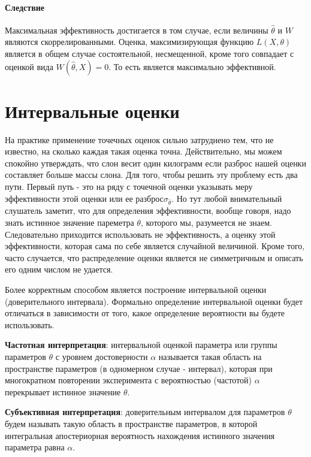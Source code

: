 \paragraph{Следствие}

Максимальная эффективность достигается в том случае, если величины
$\hat\theta$ и $W$ являются скоррелированными. Оценка,
максимизирующая функцию $L(X,\theta)$ является в общем случае
состоятельной, несмещенной, кроме того совпадает с оценкой вида
$W(\hat\theta, X) = 0$. То есть является максимально эффективной.


\section{Интервальные оценки}

    На практике применение точечных оценок сильно затруднено тем, что не
известно, на сколько каждая такая оценка точна. Действительно, мы можем
спокойно утверждать, что слон весит один килограмм если разброс нашей
оценки составляет больше массы слона. Для того, чтобы решить эту
проблему есть два пути. Первый путь - это на ряду с точечной оценки
указывать меру эффективности этой оценки или ее
разброс$\sigma_{\hat\theta}$. Но тут любой внимательный слушатель
заметит, что для определения эффективности, вообще говоря, надо знать
истинное значение пареметра $\theta$, которого мы, разумеется не
знаем. Следовательно приходится использовать не эффективность, а оценку
этой эффективности, которая сама по себе является случайной величиной.
Кроме того, часто случается, что распределение оценки является не
симметричным и описать его одним числом не удается.

Более корректным способом является построение интервальной оценки
(доверительного интервала). Формально определение интервальной оценки
будет отличаться в зависимости от того, какое определение вероятности вы
будете использовать.

\textbf{Частотная интерпретация}: интервальной оценкой параметра или
группы параметров $\theta$ с уровнем достоверности $\alpha$
называется такая область на пространстве параметров (в одномерном случае
- интервал), которая при многократном повторении эксперимента с
вероятностью (частотой) $\alpha$ перекрывает истинное значение
$\theta$.

\textbf{Субъективная интерпретация}: доверительным интервалом для
параметров $\theta$ будем называть такую область в пространстве
параметров, в которой интегральная апостериорная вероятность нахождения
истинного значения параметра равна $\alpha$.

